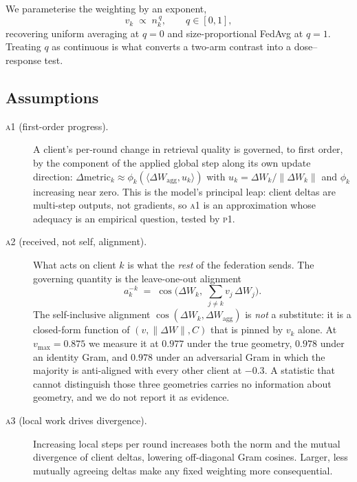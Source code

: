 We parameterise the weighting by an exponent,
\begin{equation}
v_k \;\propto\; n_k^{\,q},\qquad q\in[0,1],
\label{eq:qweight}
\end{equation}
recovering uniform averaging at $q=0$ and size-proportional FedAvg at $q=1$.
Treating $q$ as continuous is what converts a two-arm contrast into a
dose--response test.

\subsection{Assumptions}

\begin{description}
\item[\textsc{a1} (first-order progress).] A client's per-round change in
retrieval quality is governed, to first order, by the component of the applied
global step along its own update direction:
$\Delta\mathrm{metric}_k \approx \phi_k(\langle \Delta W_{\mathrm{agg}},
u_k\rangle)$ with $u_k=\Delta W_k/\|\Delta W_k\|$ and $\phi_k$ increasing near
zero. This is the model's principal leap: client deltas are multi-step outputs,
not gradients, so \textsc{a1} is an approximation whose adequacy is an empirical
question, tested by \textsc{p1}.

\item[\textsc{a2} (received, not self, alignment).] What acts on client $k$ is
what the \emph{rest} of the federation sends. The governing quantity is the
leave-one-out alignment
\begin{equation}
a_k^{-k}\;=\;\cos\!\Big(\Delta W_k,\;\textstyle\sum_{j\neq k} v_j\,\Delta W_j\Big).
\label{eq:loo}
\end{equation}
The self-inclusive alignment $\cos(\Delta W_k,\Delta W_{\mathrm{agg}})$ is
\emph{not} a substitute: it is a closed-form function of $(v,\|\Delta W\|,C)$
that is pinned by $v_k$ alone. At $v_{\max}=0.875$ we measure it at $0.977$
under the true geometry, $0.978$ under an identity Gram, and $0.978$ under an
adversarial Gram in which the majority is anti-aligned with every other client
at $-0.3$. A statistic that cannot distinguish those three geometries carries
no information about geometry, and we do not report it as evidence.

\item[\textsc{a3} (local work drives divergence).] Increasing local steps per
round increases both the norm and the mutual divergence of client deltas,
lowering off-diagonal Gram cosines. Larger, less mutually agreeing deltas make
any fixed weighting more consequential.
\end{description}

